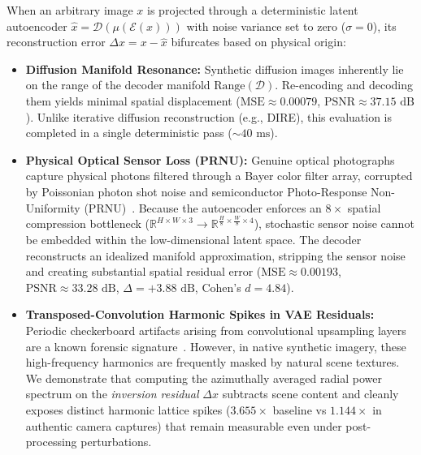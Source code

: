 \documentclass{article}
\theoremstyle{definition}
\begin{document}
When an arbitrary image $x$ is projected through a deterministic latent autoencoder $\hat{x} = \mathcal{D}(\mu(\mathcal{E}(x)))$ with noise variance set to zero ($\sigma = 0$), its reconstruction error $\Delta x = x - \hat{x}$ bifurcates based on physical origin:
\begin{itemize}
    \item \textbf{Diffusion Manifold Resonance:} Synthetic diffusion images inherently lie on the range of the decoder manifold $\text{Range}(\mathcal{D})$. Re-encoding and decoding them yields minimal spatial displacement ($\text{MSE} \approx 0.00079$, $\text{PSNR} \approx 37.15\text{ dB}$). Unlike iterative diffusion reconstruction (e.g., DIRE), this evaluation is completed in a single deterministic pass ($\sim 40\text{ ms}$).
    \item \textbf{Physical Optical Sensor Loss (PRNU):} Genuine optical photographs capture physical photons filtered through a Bayer color filter array, corrupted by Poissonian photon shot noise and semiconductor Photo-Response Non-Uniformity (PRNU)~\citep{fridrich2009digital,lukas2006digital}. Because the autoencoder enforces an $8\times$ spatial compression bottleneck ($\mathbb{R}^{H \times W \times 3} \to \mathbb{R}^{\frac{H}{8} \times \frac{W}{8} \times 4}$), stochastic sensor noise cannot be embedded within the low-dimensional latent space. The decoder reconstructs an idealized manifold approximation, stripping the sensor noise and creating substantial spatial residual error ($\text{MSE} \approx 0.00193$, $\text{PSNR} \approx 33.28\text{ dB}$, $\Delta = +3.88\text{ dB}$, Cohen's $d = 4.84$).
    \item \textbf{Transposed-Convolution Harmonic Spikes in VAE Residuals:} Periodic checkerboard artifacts arising from convolutional upsampling layers are a known forensic signature~\citep{wang2020cnn,durall2020watch,frank2020leveraging,corvi2023detection}. However, in native synthetic imagery, these high-frequency harmonics are frequently masked by natural scene textures. We demonstrate that computing the azimuthally averaged radial power spectrum on the \textit{inversion residual} $\Delta x$ subtracts scene content and cleanly exposes distinct harmonic lattice spikes ($3.655\times$ baseline vs $1.144\times$ in authentic camera captures) that remain measurable even under post-processing perturbations.
\end{itemize}
\end{document}
